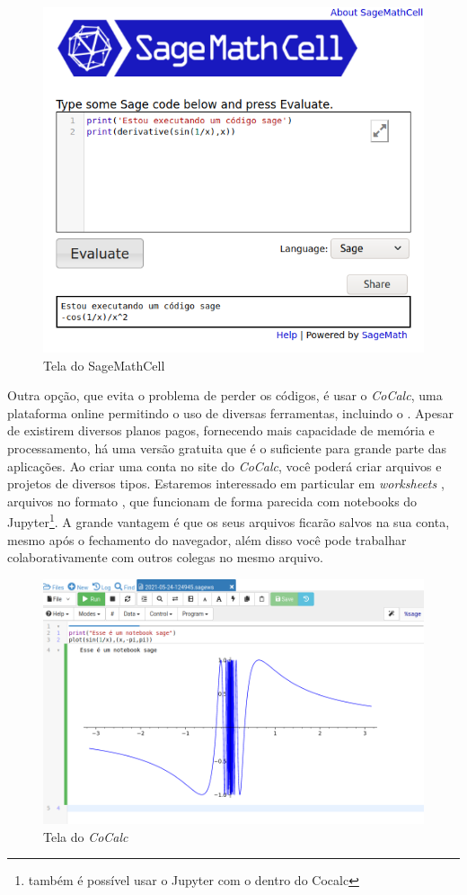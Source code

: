 \begin{figure}[ht]
  \centering
  \includegraphics[scale=0.4]{imgs/sagemathcell.png}
  \caption{Tela do SageMathCell}
  \label{fig:sagemathcell}
\end{figure}

Outra opção, que evita o problema de perder os códigos, é usar
o \emph{CoCalc}, uma plataforma online permitindo o uso
de diversas ferramentas, incluindo o \sage. Apesar de existirem 
diversos planos pagos, fornecendo mais capacidade
de memória e processamento, há uma
versão gratuita que é o suficiente para grande parte
das aplicações. Ao criar uma conta no site do \emph{CoCalc}, 
você poderá criar arquivos e projetos de diversos tipos. 
Estaremos interessado em particular em \emph{worksheets \sage},
arquivos no formato , que funcionam de forma parecida
com notebooks do Jupyter\footnote{também é possível usar o Jupyter
com o \sage dentro do Cocalc}. A grande vantagem é que os
seus arquivos ficarão salvos na sua conta, mesmo após o
fechamento do navegador, além disso você pode trabalhar
colaborativamente com outros colegas no mesmo arquivo.

\begin{figure}[h]
  \centering
  \includegraphics[scale=0.4]{imgs/cocalc.png}
  \caption{Tela do \emph{CoCalc}}
  \label{img:cocalc}
\end{figure}



